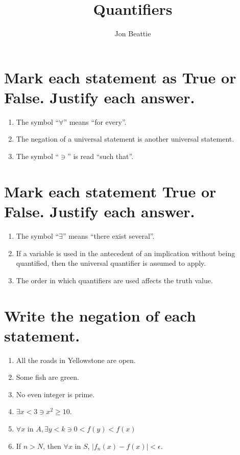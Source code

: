 \documentclass[11pt]{article} %
\title{Quantifiers}
\author{Jon Beattie}
\begin{document}
\maketitle

\section{Mark each statement as True or False. Justify each answer.}
\begin{enumerate}
\item The symbol ``$\forall$'' means ``for every''.
\item The negation of a universal statement is another universal statement.
\item The symbol ``$\ni$'' is read ``such that''.
\end{enumerate}

\section{Mark each statement True or False. Justify each answer.}
\begin{enumerate}
\item The symbol ``$\exists$'' means ``there exist several''.
\item If a variable is used in the antecedent of an implication without being quantified, then the universal quantifier is assumed to apply.
\item The order in which quantifiers are used affects the truth value.
\end{enumerate}

\section{Write the negation of each statement.}
\begin{enumerate}
\item All the roads in Yellowstone are open.
\item Some fish are green.
\item No even integer is prime.
\item $\exists x<3\ni x^2 \geq 10$.
\item $\forall x$ in $A, \exists y <k \ni 0 <f(y)<f(x)$
\item If $n>N$, then $\forall x$ in $S$, $\mid f_n(x)-f(x)\mid<\epsilon$.
\end{enumerate}
\end{document}

